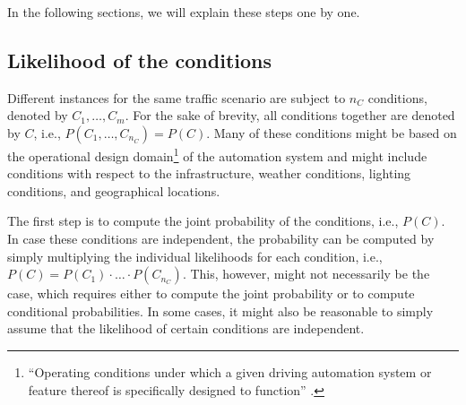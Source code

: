
In the following sections, we will explain these steps one by one. 



\subsection{Likelihood of the conditions}
\label{sec:conditions}

Different instances for the same traffic scenario are subject to $n_C$ conditions, denoted by $C_1, \ldots, C_m$. For the sake of brevity, all conditions together are denoted by $C$, i.e., $P(C_1, \ldots, C_{n_C})=P(C)$. Many of these conditions might be based on the operational design domain\footnote{``Operating conditions under which a given driving automation system or feature thereof is specifically designed to function'' \cite{sea2018j3016}.} of the automation system and might include conditions with respect to the infrastructure, weather conditions, lighting conditions, and geographical locations. 

The first step is to compute the joint probability of the conditions, i.e., $P(C)$. In case these conditions are independent, the probability can be computed by simply multiplying the individual likelihoods for each condition, i.e., $P(C)=P(C_1)\cdot\ldots\cdot P(C_{n_C})$. This, however, might not necessarily be the case, which requires either to compute the joint probability or to compute conditional probabilities. In some cases, it might also be reasonable to simply assume that the likelihood of certain conditions are independent.

